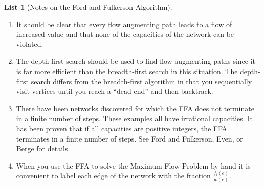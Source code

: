 \documentclass[10pt,]{book}
\theoremstyle{plain}
\theoremstyle{definition}
\theoremstyle{definition}
\theoremstyle{definition}
\theoremstyle{definition}
\theoremstyle{definition}
\newtheorem{listwrapper}[theorem]{List}
\numberwithin{equation}{section}
\begin{document}
\begin{listwrapper}[Notes on the Ford and Fulkerson Algorithm]\label{list-8}
\leavevmode%
\begin{enumerate}[label=\arabic*]
\item\hypertarget{li-89}{} It should be clear that every flow augmenting path leads to a flow of increased value and that none of the capacities of the network can be violated.%
\item\hypertarget{li-90}{} The depth-first search should be used to find flow augmenting paths since it is far more efficient than the breadth-first search in this situation. The depth-first search differs from the breadth-first algorithm  in that you sequentially visit vertices
until you reach a ``dead end'' and then backtrack.%
\item\hypertarget{li-91}{} There have been networks discovered for which the FFA does not terminate in a finite number of steps. These examples all have irrational capacities. It has been proven that if all capacities are positive integers, the FFA terminates in a finite number of steps. See Ford and Fulkerson, Even, or Berge for details.%
\item\hypertarget{li-92}{} When you use the FFA to solve the Maximum Flow Problem by hand it is convenient to label each edge of the network with the fraction \(\frac{f_i(e)}{w(e)}\).%
\end{enumerate}
\end{listwrapper}
\end{document}
